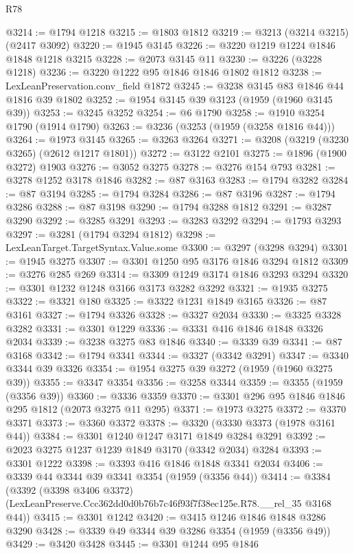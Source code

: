 \begin{lexlean}{R78}
\begin{coremodule}
@3214 := @1794 @1218
@3215 := @1803 @1812
@3219 := @3213 (@3214 @3215) (@2417 @3092)
@3220 := @1945 @3145
@3226 := @3220 @1219 @1224 @1846 @1848 @1218 @3215
@3228 := @2073 @3145 @11
@3230 := @3226 (@3228 @1218)
@3236 := @3220 @1222 @95 @1846 @1846 @1802 @1812
@3238 := LexLeanPreservation.conv_field @1872
@3245 := @3238 @3145 @83 @1846 @44 @1816 @39 @1802
@3252 := @1954 @3145 @39 @3123 (@1959 (@1960 @3145 @39))
@3253 := @3245 @3252
@3254 := @6 @1790
@3258 := @1910 @3254 @1790 (@1914 @1790)
@3263 := @3236 (@3253 (@1959 (@3258 @1816 @44)))
@3264 := @1973 @3145
@3265 := @3263 @3264
@3271 := @3208 (@3219 (@3230 @3265) (@2612 @1217 @1801))
@3272 := @3122 @2101
@3275 := @1896 (@1900 @3272) @1903
@3276 := @3052 @3275
@3278 := @3276 @154 @793
@3281 := @3278 @1252 @3178 @1846
@3282 := @87 @3163
@3283 := @1794 @3282
@3284 := @87 @3194
@3285 := @1794 @3284
@3286 := @87 @3196
@3287 := @1794 @3286
@3288 := @87 @3198
@3290 := @1794 @3288 @1812
@3291 := @3287 @3290
@3292 := @3285 @3291
@3293 := @3283 @3292
@3294 := @1793 @3293
@3297 := @3281 (@1794 @3294 @1812)
@3298 := LexLeanTarget.TargetSyntax.Value.some
@3300 := @3297 (@3298 @3294)
@3301 := @1945 @3275
@3307 := @3301 @1250 @95 @3176 @1846 @3294 @1812
@3309 := @3276 @285 @269
@3314 := @3309 @1249 @3174 @1846 @3293 @3294
@3320 := @3301 @1232 @1248 @3166 @3173 @3282 @3292
@3321 := @1935 @3275
@3322 := @3321 @180
@3325 := @3322 @1231 @1849 @3165
@3326 := @87 @3161
@3327 := @1794 @3326
@3328 := @3327 @2034
@3330 := @3325 @3328 @3282
@3331 := @3301 @1229
@3336 := @3331 @416 @1846 @1848 @3326 @2034
@3339 := @3238 @3275 @83 @1846
@3340 := @3339 @39
@3341 := @87 @3168
@3342 := @1794 @3341
@3344 := @3327 (@3342 @3291)
@3347 := @3340 @3344 @39 @3326
@3354 := @1954 @3275 @39 @3272 (@1959 (@1960 @3275 @39))
@3355 := @3347 @3354
@3356 := @3258 @3344
@3359 := @3355 (@1959 (@3356 @39))
@3360 := @3336 @3359
@3370 := @3301 @296 @95 @1846 @1846 @295 @1812 (@2073 @3275 @11 @295)
@3371 := @1973 @3275
@3372 := @3370 @3371
@3373 := @3360 @3372
@3378 := @3320 (@3330 @3373 (@1978 @3161 @44))
@3384 := @3301 @1240 @1247 @3171 @1849 @3284 @3291
@3392 := @2023 @3275 @1237 @1239 @1849 @3170 (@3342 @2034) @3284
@3393 := @3301 @1222
@3398 := @3393 @416 @1846 @1848 @3341 @2034
@3406 := @3339 @44 @3344 @39 @3341 @3354 (@1959 (@3356 @44))
@3414 := @3384
    (@3392
      (@3398 @3406 @3372)
      (LexLeanPreserve.Ccc362dd0d0b76b7c46f93f7f38ec125e.R78.__rel_35 @3168 @44))
@3415 := @3301 @1242
@3420 := @3415 @1246 @1846 @1848 @3286 @3290
@3428 := @3339 @49 @3344 @39 @3286 @3354 (@1959 (@3356 @49))
@3429 := @3420 @3428
@3445 := @3301
    @1244
    @95
    @1846

\end{coremodule}
\end{lexlean}
